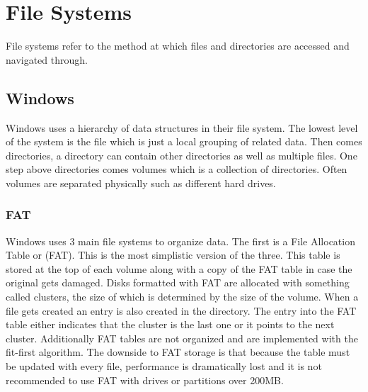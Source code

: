 \documentclass[a4paper,10pt,onecolumn]{article}
\begin{document}
\section{File Systems}
File systems refer to the method at which files and directories are accessed and navigated through.
\subsection{Windows}
Windows uses a hierarchy of data structures in their file system. The lowest level of the system is the file which is just a local grouping of related data. Then comes directories, a directory can contain other directories as well as multiple files. One step above directories comes volumes which is a collection of directories. Often volumes are separated physically such as different hard drives.
\newline
\subsubsection{FAT}
Windows uses 3 main file systems to organize data. The first is a {F}ile {A}llocation {T}able or {(FAT)}. This is the most simplistic version of the three. This table is stored at the top of each volume along with a copy of the FAT table in case the original gets damaged. Disks formatted with FAT are allocated with something called clusters, the size of which is determined by the size of the volume. When a file gets created an entry is also created in the directory. The entry into the FAT table either indicates that the cluster is the last one or it points to the next cluster. Additionally FAT tables are not organized and are implemented with the fit-first algorithm. The downside to FAT storage is that because the table must be updated with every file, performance is dramatically lost and it is not recommended to use FAT with drives or partitions over 200MB.
\end{document}
